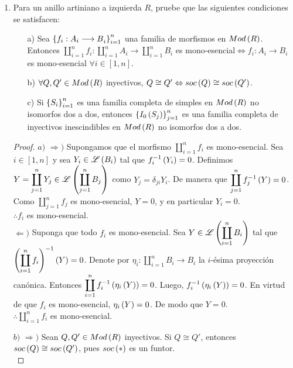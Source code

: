 \documentclass{article}
\begin{document}
\begin{enumerate}[label=\textbf{Ej \arabic*.}]
		\item Para un anillo artiniano a izquierda $R$, pruebe que las siguientes condiciones se satisfacen:
		\begin{enumerate}
			\item[a)] Sea ${\left\{{f_{i}:A_{i} \longrightarrow B}_{i}\right\}}_{i=1}^{n}$ una familia de morfismos en $Mod\left(R\right)$. Entonces $\displaystyle\coprod_{i=1}^{n}f_{i}:\displaystyle\coprod_{i=1}^{n}A_{i}\longrightarrow\displaystyle\coprod_{i=1}^{n}B_{i}$ es mono-esencial$\Leftrightarrow f_{i}:A_{i} \longrightarrow B_{i}$ es mono-esencial $\forall i \in [1,n]$.
			\item[b)] $\forall Q,Q'\in Mod\left(R\right)$ inyectivos, $Q \cong Q' \Leftrightarrow soc\left(Q\right) \cong soc\left(Q'\right)$.
			\item[c)] Si ${\left\{{S}_{i}\right\}}_{i=1}^{n}$ es una familia completa de simples en $Mod\left(R\right)$ no isomorfos dos a dos, entonces $\left\{I_{0}\left(S_{j}\right)\right\}_{j=1}^{n}$ es una familia completa de inyectivos inescindibles en $Mod\left(R\right)$ no isomorfos dos a dos.
		\end{enumerate}
		\begin{proof}
			$\boxed{a)}$ $\boxed{\Rightarrow )}$ Supongamos que el morfismo $\displaystyle\coprod_{i=1}^{n}f_{i}$ es mono-esencial. Sea $i \in [1,n]$ y sea $Y_{i}\in\mathscr{L}\left(B_{i}\right)$ tal que $f_{i}^{-1}\left(Y_{i}\right)=0$. Definimos $Y=\displaystyle\coprod_{j=1}^{n}Y_{j}\in\mathscr{L}\left(\displaystyle\coprod_{j=1}^{n}B_{j}\right)$ como $Y_{j}=\delta_{ji}Y_{i}$. De manera que $\displaystyle\coprod_{j=1}^{n}f_{j}^{-1}\left(Y\right)=0$. Como $\displaystyle\coprod_{j=1}^{n}f_{j}$ es mono-esencial, $Y=0$, y en particular $Y_{i}=0$.\\
			$\therefore f_{i}$ es mono-esencial.\\
		
			$\boxed{\Leftarrow )}$ Suponga que todo $f_{i}$ es mono-esencial. Sea $Y\in\mathscr{L}\left(\displaystyle\coprod_{i=1}^{n}B_{i}\right)$ tal que $\left(\displaystyle\coprod_{i=1}^{n}f_{i}\right)^{-1}\left(Y\right)=0$. Denote por $\eta_{i}:\displaystyle\coprod_{i=1}^{n}B_{i} \longrightarrow B_{i}$ la $i$-ésima proyección canónica. Entonces $\displaystyle\coprod_{i=1}^{n}f_{i}^{-1}\left(\eta_{i}\left(Y\right)\right)=0$. Luego, $f_{i}^{-1}\left(\eta_{i}\left(Y\right)\right)=0$. En virtud de que $f_{i}$ es mono-esencial, $\eta_{i}\left(Y\right)=0$. De modo que $Y=0$.\\
			$\therefore\displaystyle\coprod_{i=1}^{n}f_{i}$ es mono-esencial.
		
			$\boxed{b)}$ $\boxed{\Rightarrow )}$ Sean $Q,Q' \in Mod\left(R\right)$ inyectivos. Si $Q \cong Q'$, entonces $soc\left(Q\right) \cong soc\left(Q'\right)$, pues $soc\left(*\right)$ es un funtor.\\
		

\end{proof}
\end{enumerate}
\end{document}
